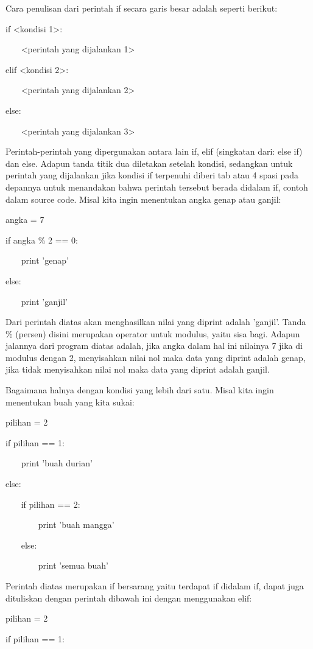  
Cara penulisan dari perintah if secara garis besar adalah seperti berikut: 
 
if <kondisi 1>: 

 
~~~ <perintah yang dijalankan 1> 

 
elif <kondisi 2>: 

 
~~~ <perintah yang dijalankan 2> 

 
else: 

 
~~~ <perintah yang dijalankan 3> 

 
Perintah-perintah yang dipergunakan antara lain   if,   elif   (singkatan dari:   else if) dan   else. Adapun tanda titik dua diletakan setelah kondisi, sedangkan untuk perintah yang dijalankan jika kondisi if terpenuhi diberi   tab   atau   4 spasi   pada depannya untuk menandakan bahwa perintah tersebut berada didalam if, contoh dalam source code. Misal kita ingin menentukan angka genap atau ganjil: 

 
angka = 7 

 
if angka    \%   2 == 0: 

 
~~~ print 'genap' 

 
else: 

 
~~~ print 'ganjil' 

 
Dari perintah diatas akan menghasilkan nilai yang diprint adalah 'ganjil'. Tanda      \%     (persen) disini merupakan operator untuk modulus, yaitu sisa bagi. Adapun jalannya dari program diatas adalah, jika angka dalam hal ini nilainya 7 jika di modulus dengan 2, menyisahkan nilai nol maka data yang diprint adalah genap, jika tidak menyisahkan nilai nol maka data yang diprint adalah ganjil. 

 
Bagaimana halnya dengan kondisi yang lebih dari satu. Misal kita ingin menentukan buah yang kita sukai: 

 
pilihan = 2 

 
if pilihan == 1: 

 
~~~ print 'buah durian' 

 
else: 

 
~~~ if pilihan == 2: 

 
~~~~~~~ print 'buah mangga' 

 
~~~ else: 

 
~~~~~~~ print 'semua buah' 

 
Perintah diatas merupakan if bersarang yaitu terdapat if didalam if, dapat juga dituliskan dengan perintah dibawah ini dengan menggunakan   elif: 

 
pilihan = 2 

 
if pilihan == 1: 

